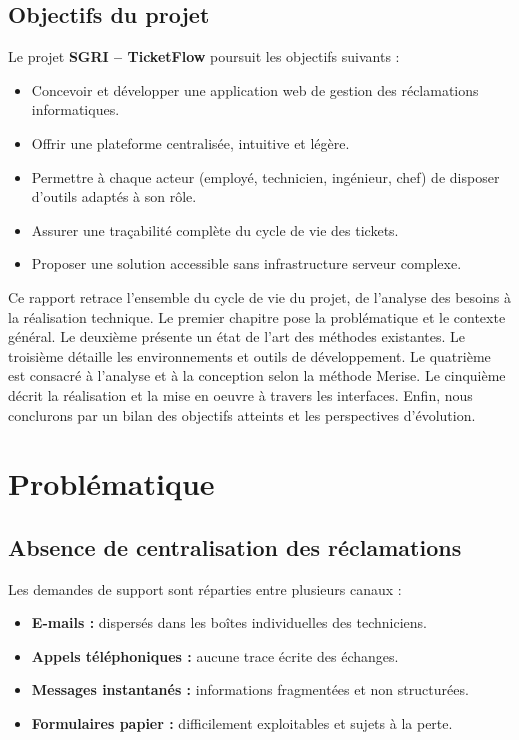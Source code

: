 \documentclass[12pt,a4paper,oneside]{report}
\begin{document}
\section{Objectifs du projet}

Le projet \textbf{SGRI -- TicketFlow} poursuit les objectifs suivants :
\begin{itemize}
    \item Concevoir et développer une application web de gestion des réclamations informatiques.
    \item Offrir une plateforme centralisée, intuitive et légère.
    \item Permettre à chaque acteur (employé, technicien, ingénieur, chef) de disposer d'outils adaptés à son rôle.
    \item Assurer une traçabilité complète du cycle de vie des tickets.
    \item Proposer une solution accessible sans infrastructure serveur complexe.
\end{itemize}

Ce rapport retrace l'ensemble du cycle de vie du projet, de l'analyse des besoins à la réalisation technique. Le premier chapitre pose la problématique et le contexte général. Le deuxième présente un état de l'art des méthodes existantes. Le troisième détaille les environnements et outils de développement. Le quatrième est consacré à l'analyse et à la conception selon la méthode Merise. Le cinquième décrit la réalisation et la mise en oeuvre à travers les interfaces. Enfin, nous conclurons par un bilan des objectifs atteints et les perspectives d'évolution.

\chapter{Problématique}

\section{Absence de centralisation des réclamations}

Les demandes de support sont réparties entre plusieurs canaux :
\begin{itemize}
    \item \textbf{E-mails :} dispersés dans les boîtes individuelles des techniciens.
    \item \textbf{Appels téléphoniques :} aucune trace écrite des échanges.
    \item \textbf{Messages instantanés :} informations fragmentées et non structurées.
    \item \textbf{Formulaires papier :} difficilement exploitables et sujets à la perte.
\end{itemize}
\end{document}
